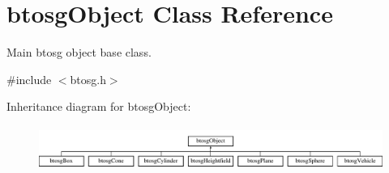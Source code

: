 \hypertarget{classbtosgObject}{}\section{btosg\+Object Class Reference}
\label{classbtosgObject}


Main btosg object base class.  




{\ttfamily \#include $<$btosg.\+h$>$}

Inheritance diagram for btosg\+Object\+:\begin{figure}[H]
\begin{center}
\leavevmode
\includegraphics[height=1.454545cm]{classbtosgObject}
\end{center}
\end{figure}
